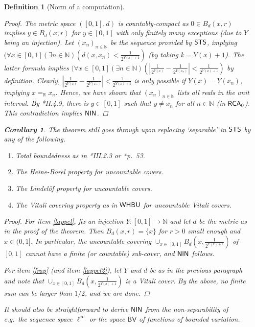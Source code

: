 \documentclass[reqno]{amsart}
\newtheorem{cor}[thm]{Corollary}
\newtheorem{defi}[thm]{Definition}
\def\RCA{\textup{\textsf{RCA}}}
\def\N{{\mathbb  N}}
\def\R{{\mathbb  R}}
\def\di{\rightarrow}
\def\STS{\textup{\textsf{STS}}}
\def\NIN{\textup{\textsf{NIN}}}
\def\WHBU{\textup{\textsf{WHBU}}}
\numberwithin{equation}{section}
\numberwithin{thm}{section}
\begin{document}
\begin{defi}[Norm of a computation]
\begin{proof}
\smallskip

The metric space $([0,1], d)$ is countably-compact as $0\in B_{d}(x, r)$ implies $y\in B_{d}(x, r)$ for $y\in [0,1]$ with only finitely many exceptions (due to $Y$ being an injection).  
Let $(x_{n})_{n\in\N}$ be the sequence provided by $\STS$, implying $(\forall x\in [0,1](\exists n\in \N)( d(x, x_{n})<\frac{1}{2^{Y(x)+1}})$ (by taking $k=Y(x)+1$).  
The latter formula implies $(\forall x\in [0,1](\exists n\in \N)( |\frac{1}{2^{Y(x)}}-\frac{1}{2^{Y(x_{n})}}|<\frac{1}{2^{Y(x)+1}})$ by definition.  
Clearly, $|\frac{1}{2^{Y(x)}}-\frac{1}{2^{Y(x_{n})}}|<\frac{1}{2^{Y(x)+1}}$ is only possible if $Y(x)=Y(x_{n})$, implying $x=_{\R}x_{n}$. 
Hence, we have shown that $(x_{n})_{n\in \N}$ lists all reals in the unit interval.
By \cite{simpson2}*{II.4.9}, there is $y\in [0,1]$ such that $y\ne x_{n}$ for all $n\in \N$ (in $\RCA_{0}$).  
This contradiction implies $\NIN$. 
\end{proof}
\begin{cor}
The theorem still goes through upon replacing `separable' in $\STS$ by any of the following.
\begin{enumerate}
 \renewcommand{\theenumi}{\alph{enumi}}
\item Total boundedness as in \cite{simpson2}*{III.2.3} or \cite{browner}*{p.\ 53}.   
\item The Heine-Borel property for \emph{uncountable} covers.\label{lappel}
\item The Lindel\"of property for \emph{uncountable} covers.\label{lappel2}
\item The Vitali covering property as in $\WHBU$ for \emph{uncountable} Vitali covers.  \label{frap}
\end{enumerate}
\end{cor}
\begin{proof}
For item \eqref{lappel}, fix an injection $Y:[0,1]\di \N$ and let $d$ be the metric as in the proof of the theorem.  
Then $B_{d}(x, r)=\{x\}$ for $r>0$ small enough and $x\in (0,1]$.  
In particular, the uncountable covering $\cup_{x\in [0,1]}B_{d}(x, \frac{1}{2^{Y(x)+1}})$ of $[0,1]$ cannot have a finite (or countable) sub-cover, and $\NIN$ follows. 

\smallskip

For item \eqref{frap} (and item \eqref{lappel2}), let $Y$ and $d$ be as in the previous paragraph and note that $\cup_{x\in [0,1]}B_{d}(x, \frac{1}{2^{Y(x)+1}})$ is a Vitali cover.  
By the above, no finite sum can be larger than $1/2$, and we are done. 
\end{proof}
It should also be straightforward to derive $\NIN$ from the \emph{non}-separability of e.g.\ the sequence space $\ell^{\infty}$ or the space $\textsf{BV}$ of functions of bounded variation.  


\end{defi}
\end{document}
